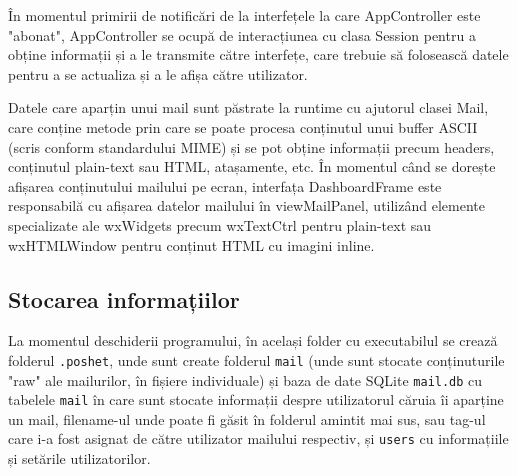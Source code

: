 \documentclass[runningheads]{llncs}
\begin{document}
În momentul primirii de notificări de la interfețele la care AppController este "abonat", AppController se ocupă de interacțiunea cu clasa Session pentru a obține informații și a le transmite către interfețe, care trebuie să folosească datele pentru a se actualiza și a le afișa către utilizator.

Datele care aparțin unui mail sunt păstrate la runtime cu ajutorul clasei Mail, care conține metode prin care se poate procesa conținutul unui buffer ASCII (scris conform standardului MIME) și se pot obține informații precum headers, conținutul plain-text sau HTML, atașamente, etc. În momentul când se dorește afișarea conținutului mailului pe ecran, interfața DashboardFrame este responsabilă cu afișarea datelor mailului în viewMailPanel, utilizând elemente specializate ale wxWidgets precum wxTextCtrl pentru plain-text sau wxHTMLWindow pentru conținut HTML cu imagini inline.


\subsection{Stocarea informațiilor}

La momentul deschiderii programului, în același folder cu executabilul se crează folderul \texttt{.poshet}, unde sunt create folderul \texttt{mail} (unde sunt stocate conținuturile "raw" ale mailurilor, în fișiere individuale) și baza de date SQLite \texttt{mail.db} cu tabelele \texttt{mail} în care sunt stocate informații despre utilizatorul căruia îi aparține un mail, filename-ul unde poate fi găsit în folderul amintit mai sus, sau tag-ul care i-a fost asignat de către utilizator mailului respectiv, și \texttt{users} cu informațiile și setările utilizatorilor.
\end{document}
